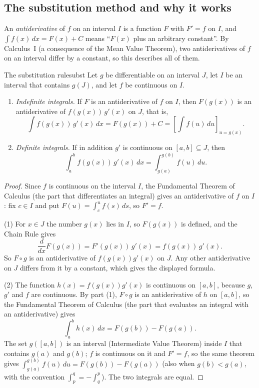 \documentclass[11pt]{article}
\begin{document}
\subsection*{The substitution method and why it works}

An \emph{antiderivative} of $f$ on an interval $I$ is a function $F$ with $F'=f$ on $I$, and $\int f(x)\,dx=F(x)+C$ means ``$F(x)$ plus an arbitrary constant''. By Calculus~I (a consequence of the Mean Value Theorem), two antiderivatives of $f$ on an interval differ by a constant, so this describes all of them.

\begin{thm}{The substitution rule}{subst}
Let $g$ be differentiable on an interval $J$, let $I$ be an interval that contains $g(J)$, and let $f$ be continuous on $I$.
\begin{enumerate}[label=(\arabic*)]
  \item \emph{Indefinite integrals.} If $F$ is an antiderivative of $f$ on $I$, then $F(g(x))$ is an antiderivative of $f(g(x))\,g'(x)$ on $J$, that is,
  \[\int f(g(x))\,g'(x)\,dx=F(g(x))+C=\left[\int f(u)\,du\right]_{u=g(x)} .\]
  \item \emph{Definite integrals.} If in addition $g'$ is continuous on $[a,b]\subseteq J$, then
  \[\int_a^b f(g(x))\,g'(x)\,dx=\int_{g(a)}^{g(b)}f(u)\,du .\]
\end{enumerate}
\end{thm}
\begin{proof}
Since $f$ is continuous on the interval $I$, the Fundamental Theorem of Calculus (the part that differentiates an integral) gives an antiderivative of $f$ on $I$: fix $c\in I$ and put $F(u)=\int_c^uf(s)\,ds$, so $F'=f$.

(1) For $x\in J$ the number $g(x)$ lies in $I$, so $F(g(x))$ is defined, and the Chain Rule gives
\[\frac{d}{dx}F(g(x))=F'(g(x))\,g'(x)=f(g(x))\,g'(x).\]
So $F\circ g$ is an antiderivative of $f(g(x))g'(x)$ on $J$. Any other antiderivative on $J$ differs from it by a constant, which gives the displayed formula.

(2) The function $h(x)=f(g(x))g'(x)$ is continuous on $[a,b]$, because $g$, $g'$ and $f$ are continuous. By part (1), $F\circ g$ is an antiderivative of $h$ on $[a,b]$, so the Fundamental Theorem of Calculus (the part that evaluates an integral with an antiderivative) gives
\[\int_a^bh(x)\,dx=F(g(b))-F(g(a)).\]
The set $g([a,b])$ is an interval (Intermediate Value Theorem) inside $I$ that contains $g(a)$ and $g(b)$; $f$ is continuous on it and $F'=f$, so the same theorem gives $\int_{g(a)}^{g(b)}f(u)\,du=F(g(b))-F(g(a))$ (also when $g(b)<g(a)$, with the convention $\int_p^q=-\int_q^p$). The two integrals are equal.
\end{proof}
\end{document}
